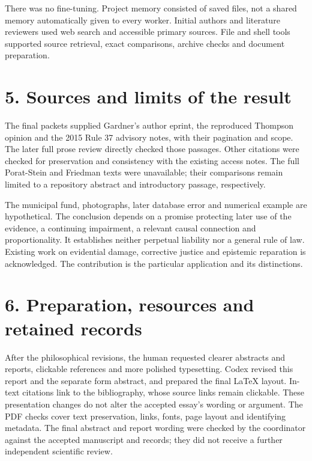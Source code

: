There was no fine-tuning. Project memory consisted of saved files, not a shared memory automatically given to every worker. Initial authors and literature reviewers used web search and accessible primary sources. File and shell tools supported source retrieval, exact comparisons, archive checks and document preparation.

\section*{5. Sources and limits of the result}

The final packets supplied Gardner's author eprint, the reproduced Thompson opinion and the 2015 Rule 37 advisory notes, with their pagination and scope. The later full prose review directly checked those passages. Other citations were checked for preservation and consistency with the existing access notes. The full Porat-Stein and Friedman texts were unavailable; their comparisons remain limited to a repository abstract and introductory passage, respectively.

The municipal fund, photographs, later database error and numerical example are hypothetical. The conclusion depends on a promise protecting later use of the evidence, a continuing impairment, a relevant causal connection and proportionality. It establishes neither perpetual liability nor a general rule of law. Existing work on evidential damage, corrective justice and epistemic reparation is acknowledged. The contribution is the particular application and its distinctions.

\section*{6. Preparation, resources and retained records}

After the philosophical revisions, the human requested clearer abstracts and reports, clickable references and more polished typesetting. Codex revised this report and the separate form abstract, and prepared the final LaTeX layout. In-text citations link to the bibliography, whose source links remain clickable. These presentation changes do not alter the accepted essay's wording or argument. The PDF checks cover text preservation, links, fonts, page layout and identifying metadata. The final abstract and report wording were checked by the coordinator against the accepted manuscript and records; they did not receive a further independent scientific review.

